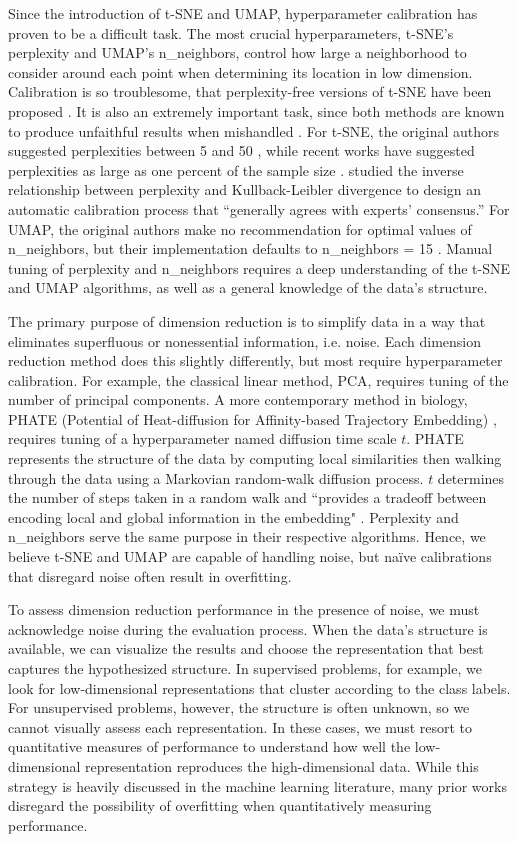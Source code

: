 \documentclass[10pt,letterpaper]{article}
\begin{document}
Since the introduction of t-SNE and UMAP, hyperparameter calibration has proven to be a difficult task. The most crucial hyperparameters, t-SNE's perplexity and UMAP's n\_neighbors, control how large a neighborhood to consider around each point when determining its location in low dimension. Calibration is so troublesome, that perplexity-free versions of t-SNE have been proposed \cite{perplexity-free t-SNE}. It is also an extremely important task, since both methods are known to produce unfaithful results when mishandled \cite{evaluation of DR transcriptomics}. For t-SNE, the original authors suggested perplexities between 5 and 50 \cite{t-SNE}, while recent works have suggested perplexities as large as one percent of the sample size \cite{t-SNE cell}. \cite{perplexity vs kl} studied the inverse relationship between perplexity and Kullback-Leibler divergence to design an automatic calibration process that ``generally agrees with experts' consensus.'' For UMAP, the original authors make no recommendation for optimal values of n\_neighbors, but their implementation defaults to n\_neighbors = 15 \cite{umap}. Manual tuning of perplexity and n\_neighbors requires a deep understanding of the t-SNE and UMAP algorithms, as well as a general knowledge of the data's structure.

The primary purpose of dimension reduction is to simplify data in a way that eliminates superfluous or nonessential information, i.e. noise. Each dimension reduction method does this slightly differently, but most require hyperparameter calibration. For example, the classical linear method, PCA, requires tuning of the number of principal components. A more contemporary method in biology, PHATE (Potential of Heat-diffusion for Affinity-based Trajectory Embedding) \cite{PHATE}, requires tuning of a hyperparameter named diffusion time scale $t$. PHATE represents the structure of the data by computing local similarities then walking through the data using a Markovian random-walk diffusion process. $t$ determines the number of steps taken in a random walk and ``provides a tradeoff between encoding local and global information in the embedding" \cite{PHATE}. Perplexity and n\_neighbors serve the same purpose in their respective algorithms. Hence, we believe t-SNE and UMAP are capable of handling noise, but na\"ive calibrations that disregard noise often result in overfitting.

To assess dimension reduction performance in the presence of noise, we must acknowledge noise during the evaluation process. When the data's structure is available, we can visualize the results and choose the representation that best captures the hypothesized structure. In supervised problems, for example, we look for low-dimensional representations that cluster according to the class labels. For unsupervised problems, however, the structure is often unknown, so we cannot visually assess each representation. In these cases, we must resort to quantitative measures of performance to understand how well the low-dimensional representation reproduces the high-dimensional data. While this strategy is heavily discussed in the machine learning literature, many prior works disregard the possibility of overfitting when quantitatively measuring performance.
\end{document}
